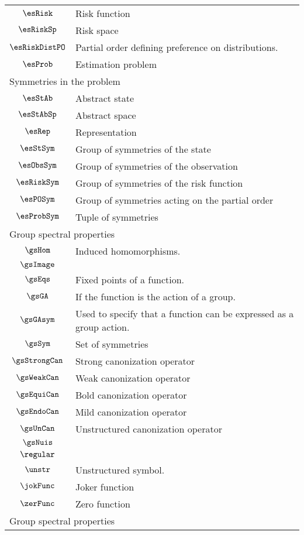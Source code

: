 \begin{longtable}{cl}
 $\esRisk$ &  Risk function\\ 
 $\esRiskSp$ &  Risk space\\ 
 $\esRiskDistPO$ &  Partial order defining preference on distributions.\\ 
 $\esProb$ &  Estimation problem\\ 
 \multicolumn{2}{l}{Symmetries in the problem}\\ 
 \hline
$\esStAb$ &  Abstract state\\ 
 $\esStAbSp$ &  Abstract space\\ 
 $\esRep$ &  Representation\\ 
 $\esStSym$ &  Group of symmetries of the state\\ 
 $\esObsSym$ &  Group of symmetries of the observation\\ 
 $\esRiskSym$ &  Group of symmetries of the risk function\\ 
 $\esPOSym$ &  Group of symmetries acting on the partial order\\ 
 $\esProbSym$ &  Tuple of symmetries\\ 
 \multicolumn{2}{l}{Group spectral properties}\\ 
 \hline
$\gsHom$ &  Induced homomorphisms.\\ 
 $\gsImage$ &  \\ 
 $\gsEqs$ &  Fixed points of a function.\\ 
 $\gsGA$ &  If the function is the action of a group.\\ 
 $\gsGAsym$ &  Used to specify that a function can be expressed as a group action.\\ 
 $\gsSym$ &  Set of symmetries\\ 
 $\gsStrongCan$ &  Strong canonization operator\\ 
 $\gsWeakCan$ &  Weak canonization operator\\ 
 $\gsEquiCan$ &  Bold canonization operator\\ 
 $\gsEndoCan$ &  Mild canonization operator\\ 
 $\gsUnCan$ &  Unstructured canonization operator\\ 
 $\gsNuis$ &  \\ 
 $\regular$ & \\ 
 $\unstr$ &  Unstructured symbol.\\ 
 $\jokFunc$ &  Joker function\\ 
 $\zerFunc$ &  Zero function\\ 
 \multicolumn{2}{l}{Group spectral properties}\\ 

\end{longtable}
